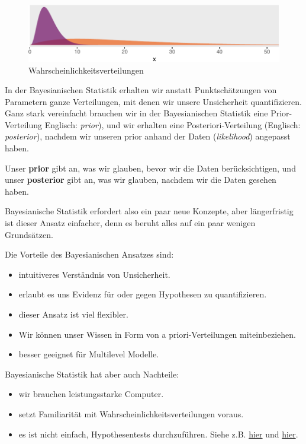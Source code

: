 \documentclass[]{tufte-handout}
\begin{document}
\begin{figure}
\includegraphics{01-intro-bayesian-stats_files/figure-latex/gamma-dist-1} \caption[Wahrscheinlichkeitsverteilungen]{Wahrscheinlichkeitsverteilungen}\label{fig:gamma-dist}
\end{figure}

In der Bayesianischen Statistik erhalten wir anstatt Punktschätzungen
von Parametern ganze Verteilungen, mit denen wir unsere Unsicherheit
quantifizieren. Ganz stark vereinfacht brauchen wir in der
Bayesianischen Statistik eine Prior-Verteilung Englisch: \emph{prior}),
und wir erhalten eine Posteriori-Verteilung (Englisch:
\emph{posterior}), nachdem wir unseren prior anhand der Daten
(\emph{likelihood}) angepasst haben.

Unser \textbf{prior} gibt an, was wir glauben, bevor wir die Daten
berücksichtigen, und unser \textbf{posterior} gibt an, was wir glauben,
nachdem wir die Daten gesehen haben.

Bayesianische Statistik erfordert also ein paar neue Konzepte, aber
längerfristig ist dieser Ansatz einfacher, denn es beruht alles auf ein
paar wenigen Grundsätzen.

Die Vorteile des Bayesianischen Ansatzes sind:

\begin{itemize}
\item
  intuitiveres Verständnis von Unsicherheit.
\item
  erlaubt es uns Evidenz für oder gegen Hypothesen zu quantifizieren.
\item
  dieser Ansatz ist viel flexibler.
\item
  Wir können unser Wissen in Form von a priori-Verteilungen
  miteinbeziehen.
\item
  besser geeignet für Multilevel Modelle.
\end{itemize}

Bayesianische Statistik hat aber auch Nachteile:

\begin{itemize}
\item
  wir brauchen leistungsstarke Computer.
\item
  setzt Familiarität mit Wahrscheinlichkeitsverteilungen voraus.
\item
  es ist nicht einfach, Hypothesentests durchzuführen. Siehe z.B.
  \href{https://statmodeling.stat.columbia.edu/2017/05/04/hypothesis-testing-hint-not-think/}{hier}
  und
  \href{https://statmodeling.stat.columbia.edu/2011/04/02/so-called_bayes/}{hier}.
\end{itemize}
\end{document}
